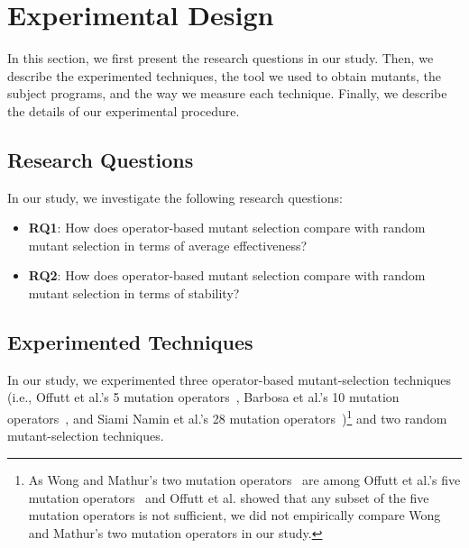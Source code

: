 \vspace{-2ex}

\section{Experimental Design}
\label{Experiment}

In this section, we first present the research questions in our
study. Then, we describe the experimented techniques, the tool we
used to obtain mutants, the subject programs, and the way we
measure each technique. Finally, we describe the details of our
experimental procedure.

\vspace{-1ex}
\subsection{Research Questions}
\label{Questions}

In our study, we investigate the following research questions:

\begin{itemize}
\vspace{-1ex}

\item \textbf{RQ1}: How does operator-based mutant selection
compare with random mutant selection in terms of average
effectiveness?\vspace{-1ex}

\item \textbf{RQ2}: How does operator-based mutant selection
compare with random mutant selection in terms of
stability?\vspace{-1ex}

\end{itemize}

\subsection{Experimented Techniques}
\label{Techniques}

In our study, we experimented three operator-based
mutant-selection techniques (i.e., Offutt et al.'s 5 mutation
operators~\cite{Offutt:96}, Barbosa et al.'s 10 mutation
operators~\cite{Barbosa:01}, and Siami Namin et al.'s 28 mutation
operators~\cite{SiamiNamin:08})\footnote{As Wong and Mathur's two
mutation operators~\cite{Wong:93,Wong:95} are among Offutt et
al.'s five mutation operators~\cite{Offutt:96} and Offutt et al.
showed that any subset of the five mutation operators is not
sufficient, we did not empirically compare Wong and Mathur's two
mutation operators in our study.} and two random mutant-selection
techniques.

